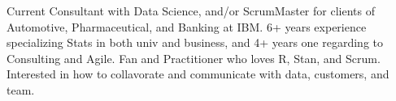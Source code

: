 

\begin{cvparagraph}

Current Consultant with Data Science, and/or ScrumMaster for clients of Automotive, Pharmaceutical, and Banking at IBM.
6+ years experience specializing Stats in both univ and business, and 4+ years one regarding to Consulting and Agile.
Fan and Practitioner who loves R, Stan, and Scrum.
Interested in how to collavorate and communicate with data, customers, and team.
\end{cvparagraph}
